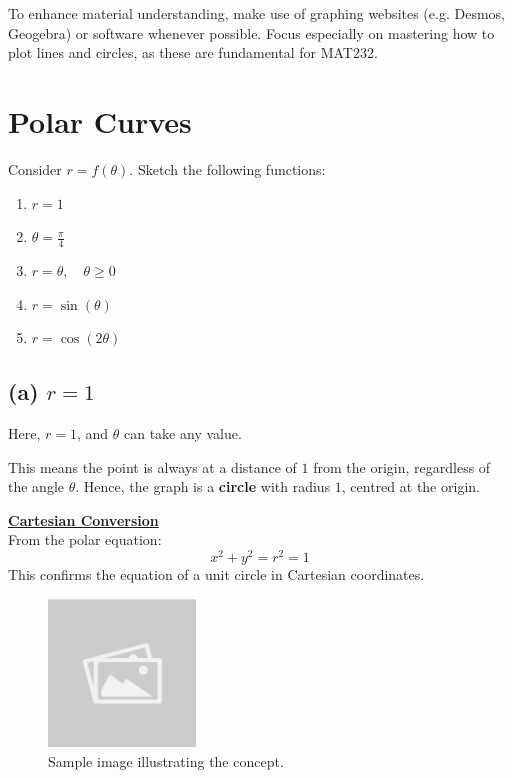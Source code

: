 \documentclass{article}
\begin{document}
\begin{notebox}
    To enhance material understanding, make use of graphing websites (e.g. Desmos, Geogebra) or software whenever possible. Focus especially on mastering how to plot lines and circles, as these are fundamental for MAT232.
\end{notebox}
\section*{Polar Curves}
\begin{examplebox}
Consider \( r = f(\theta) \). Sketch the following functions: 
\begin{enumerate}[label=(\alph*)]
    \item \( r = 1 \)
    \item \( \theta = \frac{\pi}{4} \)
    \item \( r = \theta, \quad \theta \geq 0 \)
    \item \( r = \sin(\theta) \)
    \item \( r = \cos(2\theta) \)
\end{enumerate}
\end{examplebox}

\subsection*{(a) \( r = 1 \)}
\begin{solutionbox}
Here, \( r = 1 \), and \( \theta \) can take any value. 

This means the point is always at a distance of \( 1 \) from the origin, regardless of the angle \( \theta \). Hence, the graph is a \textbf{circle} with radius \( 1 \), centred at the origin.

\begin{remarkbox}
    \textbf{\underline{Cartesian Conversion}} \\
    From the polar equation:
    \[
    x^2 + y^2 = r^2 = 1
    \]
    This confirms the equation of a unit circle in Cartesian coordinates.
\end{remarkbox}
\begin{figure}[H]
    \centering
    \includegraphics[width=0.35\textwidth]{sample_image.jpg}
    \caption{Sample image illustrating the concept.}
    \label{fig:sample_image}
\end{figure}
\end{solutionbox}
\end{document}
